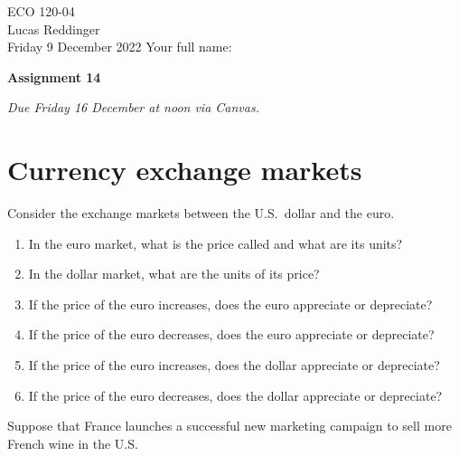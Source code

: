 \documentclass[
    letterpaper,paper=portrait,fleqn,
    DIV=16,fontsize=12pt,twoside=semi,
    parskip=full-,
    headings=standardclasses]
{scrartcl}
\begin{document}
\RaggedRight
\thispagestyle{plain}

ECO 120-04 \\
Lucas Reddinger \\
Friday 9 December 2022 \hfill Your full name: \underline{\hspace{3.25in}}

\vspace{0.7\baselineskip}
\textbf{\LARGE Assignment 14}
\vspace{0.3\baselineskip}

\emph{Due Friday 16 December at noon via Canvas.}

\section{Currency exchange markets}

Consider the exchange markets between the U.S.~dollar and the euro.

\begin{enumerate}

\item In the euro market, what is the price called and what are its units?

\vfill

\item In the dollar market, what are the units of its price?

\vfill

\item If the price of the euro increases, does the euro appreciate or depreciate?

\vfill

\item If the price of the euro decreases, does the euro appreciate or depreciate?

\vfill

\item If the price of the euro increases, does the dollar appreciate or depreciate?

\vfill

\item If the price of the euro decreases, does the dollar appreciate or depreciate?

\vfill

\end{enumerate}

\vspace{-2.0\baselineskip}

\clearpage

Suppose that France launches a successful new marketing campaign to sell more French wine in the U.S.
\end{document}
